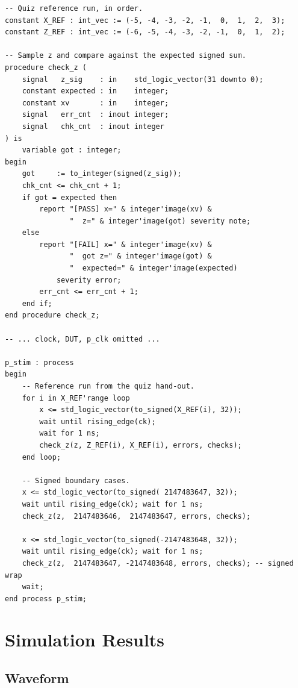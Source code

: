 \documentclass[11pt,letterpaper]{article}
\begin{document}
\begin{lstlisting}[caption={tb\_user\_logic.vhd -- excerpt of the
                   self-checking stimulus and check procedure},label={lst:tb}]
-- Quiz reference run, in order.
constant X_REF : int_vec := (-5, -4, -3, -2, -1,  0,  1,  2,  3);
constant Z_REF : int_vec := (-6, -5, -4, -3, -2, -1,  0,  1,  2);

-- Sample z and compare against the expected signed sum.
procedure check_z (
    signal   z_sig    : in    std_logic_vector(31 downto 0);
    constant expected : in    integer;
    constant xv       : in    integer;
    signal   err_cnt  : inout integer;
    signal   chk_cnt  : inout integer
) is
    variable got : integer;
begin
    got     := to_integer(signed(z_sig));
    chk_cnt <= chk_cnt + 1;
    if got = expected then
        report "[PASS] x=" & integer'image(xv) &
               "  z=" & integer'image(got) severity note;
    else
        report "[FAIL] x=" & integer'image(xv) &
               "  got z=" & integer'image(got) &
               "  expected=" & integer'image(expected)
            severity error;
        err_cnt <= err_cnt + 1;
    end if;
end procedure check_z;

-- ... clock, DUT, p_clk omitted ...

p_stim : process
begin
    -- Reference run from the quiz hand-out.
    for i in X_REF'range loop
        x <= std_logic_vector(to_signed(X_REF(i), 32));
        wait until rising_edge(ck);
        wait for 1 ns;
        check_z(z, Z_REF(i), X_REF(i), errors, checks);
    end loop;

    -- Signed boundary cases.
    x <= std_logic_vector(to_signed( 2147483647, 32));
    wait until rising_edge(ck); wait for 1 ns;
    check_z(z,  2147483646,  2147483647, errors, checks);

    x <= std_logic_vector(to_signed(-2147483648, 32));
    wait until rising_edge(ck); wait for 1 ns;
    check_z(z,  2147483647, -2147483648, errors, checks); -- signed wrap
    wait;
end process p_stim;
\end{lstlisting}

\section{Simulation Results}

\subsection{Waveform}
\end{document}
